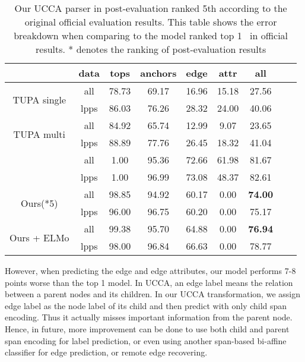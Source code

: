 \begin{table}[!h]
\small
\centering
\setlength{\tabcolsep}{2.5pt}

\begin{tabular}{ccccccccc}
\toprule
                              & data & tops  & anchors & edge  & attr  & all   \\ \hline
\multirow{2}{*}{ TUPA
single }                      & all  & 78.73 & 69.17   & 16.96 & 15.18 & 27.56 \\
                              & lpps & 86.03 & 76.26   & 28.32 & 24.00 & 40.06 \\
\multirow{2}{*}{ TUPA
multi }                       & all  & 84.92 & 65.74   & 12.99 &  9.07 & 23.65 \\
                              & lpps & 88.89 & 77.76   & 26.45 & 18.32 & 41.04 \\
\multirow{2}{*}{\cite{Che:Dou:Xu:19}}       & all  & 1.00  & 95.36   & 72.66 & 61.98 & 81.67 \\
                              & lpps & 1.00  & 96.99   & 73.08 & 48.37 & 82.61 \\ \hline
\multirow{2}{*}{ Ours(*5)}    & all  & 98.85 & 94.92   & 60.17 & 0.00  & {\bf 74.00} \\
                              & lpps & 96.00 & 96.75   & 60.20 & 0.00  & 75.17 \\
\multirow{2}{*}{ Ours + ELMo} & all  & 99.38 & 95.70   & 64.88 & 0.00  & {\bf 76.94} \\
                              & lpps & 98.00 & 96.84   & 66.63 & 0.00  & 78.77 \\ \bottomrule
\end{tabular}
\caption{\label{tbl:results_ucca} Our UCCA parser in post-evaluation ranked 5th according to the original official evaluation results. This table shows the error breakdown when comparing to the model ranked top 1~\cite{Che:Dou:Xu:19} in official results. * denotes the ranking of post-evaluation results }
\end{table}

However, when predicting the edge and edge attributes, our model
performs 7-8 points worse than the top 1 model. In UCCA, an edge label
means the relation between a parent nodes and its children. In our
UCCA transformation, we assign edge label as the node label of its
child and then predict with only child span encoding. Thus it actually
misses important information from the parent node. Hence, in future,
more improvement can be done to use both child and parent span
encoding for label prediction, or even using another span-based
bi-affine classifier for edge prediction, or remote edge recovering.


